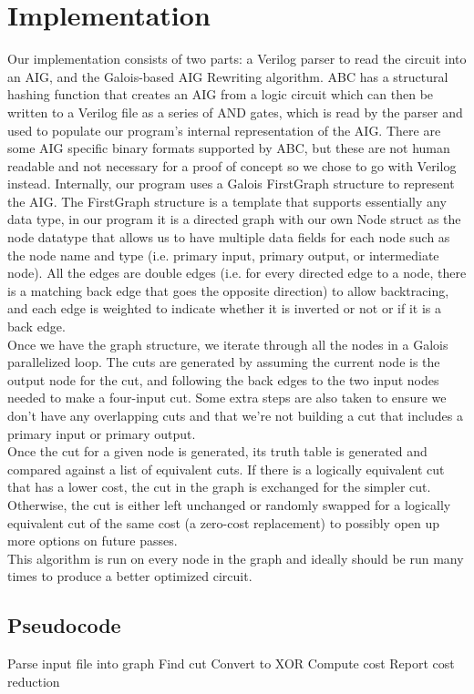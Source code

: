 \documentclass[twocolumn]{article}
\begin{document}
\section{Implementation}
Our implementation consists of two parts: a Verilog parser to read the circuit into an AIG, and the Galois-based AIG Rewriting algorithm. ABC has a structural hashing function that creates an AIG from a logic circuit which can then be written to a Verilog file as a series of AND gates, which is read by the parser and used to populate our program's internal representation of the AIG.  There are some AIG specific binary formats supported by ABC, but these are not human readable and not necessary for a proof of concept so we chose to go with Verilog instead.\newline\indent
Internally, our program uses a Galois FirstGraph structure to represent the AIG. The FirstGraph structure is a template that supports essentially any data type, in our program it is a directed graph with our own Node struct as the node datatype that allows us to have multiple data fields for each node such as the node name and type (i.e. primary input, primary output, or intermediate node).  All the edges are double edges (i.e. for every directed edge to a node, there is a matching back edge that goes the opposite direction) to allow backtracing, and each edge is weighted to indicate whether it is inverted or not or if it is a back edge.\\\indent
Once we have the graph structure, we iterate through all the nodes in a Galois parallelized loop. The cuts are generated by assuming the current node is the output node for the cut, and following the back edges to the two input nodes needed to make a four-input cut.  Some extra steps are also taken to ensure we don't have any overlapping cuts and that we're not building a cut that includes a primary input or primary output.\\\indent
Once the cut for a given node is generated, its truth table is generated and compared against a list of equivalent cuts. If there is a logically equivalent cut that has a lower cost, the cut in the graph is exchanged for the simpler cut. Otherwise, the cut is either left unchanged or randomly swapped for a logically equivalent cut of the same cost (a zero-cost replacement) to possibly open up more options on future passes.\\\indent
This algorithm is run on every node in the graph and ideally should be run many times to produce a better optimized circuit.
\subsection{Pseudocode}
\begin{algorithmic}[1]
\STATE Parse input file into graph
\STATE Find cut
\STATE Convert to XOR
\STATE Compute cost
\ENDIF
\ENDFOR
\ENDFOR
\STATE Report cost reduction
\end{algorithmic}
\end{document}
